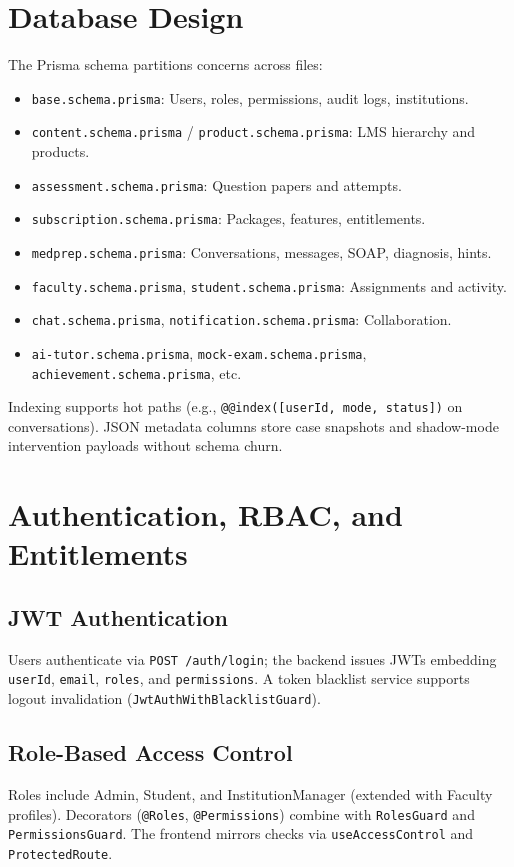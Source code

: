 \section{Database Design}
The Prisma schema partitions concerns across files:
\begin{itemize}
  \item \texttt{base.schema.prisma}: Users, roles, permissions, audit logs, institutions.
  \item \texttt{content.schema.prisma} / \texttt{product.schema.prisma}: LMS hierarchy and products.
  \item \texttt{assessment.schema.prisma}: Question papers and attempts.
  \item \texttt{subscription.schema.prisma}: Packages, features, entitlements.
  \item \texttt{medprep.schema.prisma}: Conversations, messages, SOAP, diagnosis, hints.
  \item \texttt{faculty.schema.prisma}, \texttt{student.schema.prisma}: Assignments and activity.
  \item \texttt{chat.schema.prisma}, \texttt{notification.schema.prisma}: Collaboration.
  \item \texttt{ai-tutor.schema.prisma}, \texttt{mock-exam.schema.prisma}, \texttt{achievement.schema.prisma}, etc.
\end{itemize}
Indexing supports hot paths (e.g., \texttt{@@index([userId, mode, status])} on conversations). JSON metadata columns store case snapshots and shadow-mode intervention payloads without schema churn.

\section{Authentication, RBAC, and Entitlements}
\subsection{JWT Authentication}
Users authenticate via \texttt{POST /auth/login}; the backend issues JWTs embedding \texttt{userId}, \texttt{email}, \texttt{roles}, and \texttt{permissions}. A token blacklist service supports logout invalidation (\texttt{JwtAuthWithBlacklistGuard}).

\subsection{Role-Based Access Control}
Roles include Admin, Student, and InstitutionManager (extended with Faculty profiles). Decorators (\texttt{@Roles}, \texttt{@Permissions}) combine with \texttt{RolesGuard} and \texttt{PermissionsGuard}. The frontend mirrors checks via \texttt{useAccessControl} and \texttt{ProtectedRoute}.

